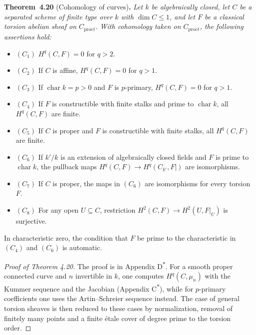 \documentclass[11pt]{article}
\newenvironment{bpstatement}[2]{\par\addvspace{0.6\baselineskip}\noindent\textbf{#1}#2\textbf{.}\enspace\ignorespaces}
  {\par\addvspace{0.4\baselineskip}}
\newenvironment{bpstatementit}[2]{\begin{bpstatement}{#1}{#2}\itshape\ignorespaces}{\end{bpstatement}}
\newcommand{\bpout}[1]{#1\textsuperscript{\hyperlink{bp-outside}{\ensuremath{\ast}}}}
\begin{document}
\label{bp56}%
\begin{bpstatementit}{Theorem~4.20}{ (Cohomology of curves)}
Let \(k\) be algebraically closed, let \(C\) be a separated scheme of finite type over \(k\) with \(\dim C\leq1\), and let \(F\) be a classical torsion abelian sheaf on \(C_{\mathrm{pro}\acute{e}t}\). With cohomology taken on \(C_{\mathrm{pro}\acute{e}t}\), the following assertions hold:

\begin{itemize}
\item \((C_{1})\) \(H^q(C,F)=0\) for \(q>2\).
\item \((C_{2})\) If \(C\) is affine, \(H^q(C,F)=0\) for \(q>1\).
\item \((C_{3})\) If \(\operatorname{char}k=p>0\) and \(F\) is \(p\)-primary, \(H^q(C,F)=0\) for \(q>1\).
\item \((C_{4})\) If \(F\) is constructible with finite stalks and prime to \(\operatorname{char}k\), all \(H^q(C,F)\) are finite.
\item \((C_{5})\) If \(C\) is proper and \(F\) is constructible with finite stalks, all \(H^q(C,F)\) are finite.
\item \((C_{6})\) If \(k'/k\) is an extension of algebraically closed fields and \(F\) is prime to \(\operatorname{char}k\), the pullback maps \(H^q(C,F)\to H^q(C_{k'},F|)\) are isomorphisms.
\item \((C_{7})\) If \(C\) is proper, the maps in \((C_6)\) are isomorphisms for every torsion \(F\).
\item \((C_{8})\) For any open \(U\subseteq C\), restriction \(H^2(C,F)\to H^2(U,F|_U)\) is surjective.
\end{itemize}
\end{bpstatementit}

\label{bp57}%
In characteristic zero, the condition that \(F\) be prime to the characteristic in \((C_4)\) and \((C_6)\) is automatic.

\begin{proof}[{Proof of Theorem 4.20}]\label{bp58}%
The proof is in Appendix \bpout{D}. For a smooth proper connected curve and \(n\) invertible in \(k\), one computes \(H^q(C,\mu_n)\) with the Kummer sequence and the Jacobian (Appendix \bpout{C}), while for \(p\)-primary coefficients one uses the Artin–Schreier sequence instead. The case of general torsion sheaves is then reduced to these cases by normalization, removal of finitely many points and a finite étale cover of degree prime to the torsion order.
\end{proof}
\end{document}
